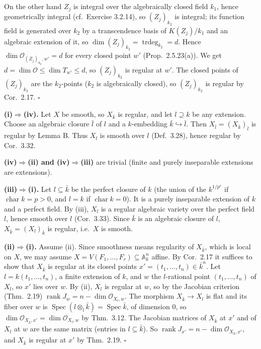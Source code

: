 \documentclass[11pt]{article}
\begin{document}
On the other hand $Z_j$ is integral over the algebraically closed field $k_1$, hence geometrically integral (cf.\ Exercise 3.2.14), so $(Z_j)_{k_2}$ is integral; its function field is generated over $k_2$ by a transcendence basis of $K(Z_j)/k_1$ and an algebraic extension of it, so $\dim(Z_j)_{k_2}=\operatorname{trdeg}_{k_2}=d$. Hence $\dim\mathcal O_{(Z_j)_{k_2},w'}=d$ for every closed point $w'$ (Prop.~2.5.23(a)). We get $d=\dim\mathcal O\le\dim T_{w'}\le d$, so $(Z_j)_{k_2}$ is regular at $w'$. The closed points of $(Z_j)_{k_2}$ are the $k_2$-points ($k_2$ is algebraically closed), so $(Z_j)_{k_2}$ is regular by Cor.~2.17. $\square$

\textbf{(i)$\Rightarrow$(iv).} Let $X$ be smooth, so $X_{\bar k}$ is regular, and let $l\supseteq k$ be any extension. Choose an algebraic closure $\bar l$ of $l$ and a $k$-embedding $\bar k\hookrightarrow\bar l$. Then $X_{\bar l}=(X_{\bar k})_{\bar l}$ is regular by Lemma B. Thus $X_l$ is smooth over $l$ (Def.~3.28), hence regular by Cor.~3.32.

\textbf{(iv)$\Rightarrow$(ii) and (iv)$\Rightarrow$(iii)} are trivial (finite and purely inseparable extensions are extensions).

\textbf{(iii)$\Rightarrow$(i).} Let $l\subseteq\bar k$ be the perfect closure of $k$ (the union of the $k^{1/p^e}$ if $\operatorname{char}k=p>0$, and $l=k$ if $\operatorname{char}k=0$). It is a purely inseparable extension of $k$ and a perfect field. By (iii), $X_l$ is a regular algebraic variety over the perfect field $l$, hence smooth over $l$ (Cor.~3.33). Since $\bar k$ is an algebraic closure of $l$, $X_{\bar k}=(X_l)_{\bar k}$ is regular, i.e.\ $X$ is smooth.

\textbf{(ii)$\Rightarrow$(i).} Assume (ii). Since smoothness means regularity of $X_{\bar k}$, which is local on $X$, we may assume $X=V(F_1,\dots,F_r)\subseteq\mathbb A^n_k$ affine. By Cor.~2.17 it suffices to show that $X_{\bar k}$ is regular at its closed points $x'=(t_1,\dots,t_n)\in\bar k^n$. Let $l=k(t_1,\dots,t_n)$, a finite extension of $k$, and $w$ the $l$-rational point $(t_1,\dots,t_n)$ of $X_l$, so $x'$ lies over $w$. By (ii), $X_l$ is regular at $w$, so by the Jacobian criterion (Thm.~2.19) $\operatorname{rank}J_w=n-\dim\mathcal O_{X_l,w}$. The morphism $X_{\bar k}\to X_l$ is flat and its fiber over $w$ is $\operatorname{Spec}(l\otimes_l\bar k)=\operatorname{Spec}\bar k$, of dimension $0$, so $\dim\mathcal O_{X_{\bar k},x'}=\dim\mathcal O_{X_l,w}$ by Thm.~3.12. The Jacobian matrices of $X_{\bar k}$ at $x'$ and of $X_l$ at $w$ are the same matrix (entries in $l\subseteq\bar k$). So $\operatorname{rank}J_{x'}=n-\dim\mathcal O_{X_{\bar k},x'}$, and $X_{\bar k}$ is regular at $x'$ by Thm.~2.19. \hfill$\square$
\end{document}
